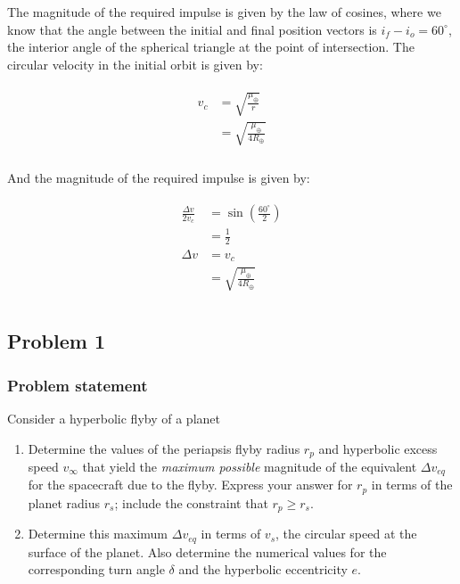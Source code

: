 \documentclass[
]{article}
\providecommand{\tightlist}{%
  \setlength{\itemsep}{0pt}\setlength{\parskip}{0pt}}
\begin{document}
The magnitude of the required impulse is given by the law of cosines,
where we know that the angle between the initial and final position
vectors is \(i_f - i_o = 60^\circ\), the interior angle of the spherical
triangle at the point of intersection. The circular velocity in the
initial orbit is given by:

\[\begin{aligned}
\begin{aligned}
    v_c &= \sqrt{\frac{\mu_\oplus}{r}} \\
    &= \sqrt{\frac{\mu_\oplus}{4R_\oplus}} \\
\end{aligned}
\end{aligned}\]

And the magnitude of the required impulse is given by:

\[\begin{aligned}
\begin{aligned}
    \frac{\Delta v}{2 v_c} &= \sin\left( \frac{60^\circ}{2} \right) \\
    &= \frac{1}{2} \\
    \Delta v &= v_c \\
    &= \sqrt{\frac{\mu_\oplus}{4R_\oplus}} \\
\end{aligned}
\end{aligned}\]

\subsection{Problem 1}\label{problem-1}

\subsubsection{Problem statement}\label{problem-statement-1}

Consider a hyperbolic flyby of a planet

\begin{enumerate}
\tightlist
\item
  Determine the values of the periapsis flyby radius \(r_p\) and
  hyperbolic excess speed \(v_\infty\) that yield the \emph{maximum
  possible} magnitude of the equivalent \(\Delta v_{eq}\) for the
  spacecraft due to the flyby. Express your answer for \(r_p\) in terms
  of the planet radius \(r_s\); include the constraint that
  \(r_p \geq r_s\).
\item
  Determine this maximum \(\Delta v_{eq}\) in terms of \(v_s\), the
  circular speed at the surface of the planet. Also determine the
  numerical values for the corresponding turn angle \(\delta\) and the
  hyperbolic eccentricity \(e\).
\end{enumerate}
\end{document}
